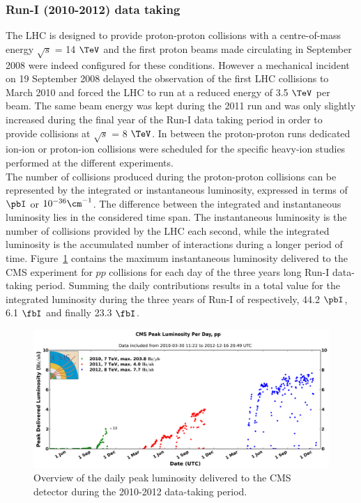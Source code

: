 \subsubsection{Run-I (2010-2012) data taking}

The LHC is  designed to provide proton-proton collisions with a centre-of-mass energy $\sqrt{s}$ = 14 $\TeV$ and the first proton beams made circulating in September 2008 were indeed configured for these conditions. However a mechanical incident on 19 September 2008 delayed the observation of the first LHC collisions to March 2010 and forced the LHC to run at a reduced energy of 3.5 $\TeV$ per beam. The same beam energy was kept during the 2011 run and was only slightly increased during the final year of the Run-I data taking period in order to provide collisions at $\sqrt{s}$ = 8 $\TeV$. In between the proton-proton runs dedicated ion-ion or proton-ion collisions were scheduled for the specific heavy-ion studies performed at the different experiments.
\\
The number of collisions produced during the proton-proton collisions can be represented by the integrated or instantaneous luminosity, expressed in terms of $\pbI$ or $10^{-36} \cm^{-1}$. The difference between the integrated and instantaneous luminosity lies in the considered time span. The instantaneous luminosity is the number of collisions provided by the LHC each second, while the integrated luminosity is the accumulated number of interactions during a longer period of time. Figure~\ref{fig::InstLumi} contains the maximum instantaneous luminosity delivered to the CMS experiment for $pp$ collisions for each day of the three years long Run-I data-taking period.
Summing the daily contributions results in a total value for the integrated luminosity during the three years of Run-I of respectively, 44.2 $\pbI$, 6.1 $\fbI$ and finally 23.3 $\fbI$.
\begin{figure}[h!t]
 \centering
 \includegraphics[width = 0.95 \textwidth]{Chapters/Chapter2_CERN/Figures/InstanteneousLumi_FullRunI.png}
 \caption{Overview of the daily peak luminosity delivered to the CMS detector during the 2010-2012 data-taking period.} 
 \label{fig::InstLumi}
\end{figure}

